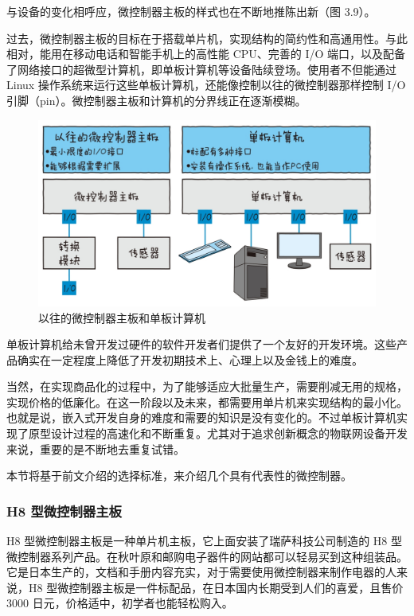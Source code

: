 \documentclass[12pt,UTF8]{ctexbook}
\begin{document}
与设备的变化相呼应，微控制器主板的样式也在不断地推陈出新（图 3.9）。

过去，微控制器主板的目标在于搭载单片机，实现结构的简约性和高通用性。与此相对，能用在移动电话和智能手机上的高性能 CPU、完善的 I/O 端口，以及配备了网络接口的超微型计算机，即单板计算机等设备陆续登场。使用者不但能通过 Linux 操作系统来运行这些单板计算机，还能像控制以往的微控制器那样控制 I/O 引脚（pin）。微控制器主板和计算机的分界线正在逐渐模糊。

\begin{figure}[htbp]
	\centering
	\includegraphics[width=1\linewidth]{60}
	\caption{以往的微控制器主板和单板计算机}
	\label{fig:1}
\end{figure}

单板计算机给未曾开发过硬件的软件开发者们提供了一个友好的开发环境。这些产品确实在一定程度上降低了开发初期技术上、心理上以及金钱上的难度。

当然，在实现商品化的过程中，为了能够适应大批量生产，需要削减无用的规格，实现价格的低廉化。在这一阶段以及未来，都需要用单片机来实现结构的最小化。也就是说，嵌入式开发自身的难度和需要的知识是没有变化的。不过单板计算机实现了原型设计过程的高速化和不断重复。尤其对于追求创新概念的物联网设备开发来说，重要的是不断地去重复试错。

本节将基于前文介绍的选择标准，来介绍几个具有代表性的微控制器。

\subsubsection{H8 型微控制器主板}

H8 型微控制器主板是一种单片机主板，它上面安装了瑞萨科技公司制造的 H8 型微控制器系列产品。在秋叶原和邮购电子器件的网站都可以轻易买到这种组装品。它是日本生产的，文档和手册内容充实，对于需要使用微控制器来制作电器的人来说，H8 型微控制器主板是一件标配品，在日本国内长期受到人们的喜爱，且售价 3000 日元，价格适中，初学者也能轻松购入。
\end{document}
